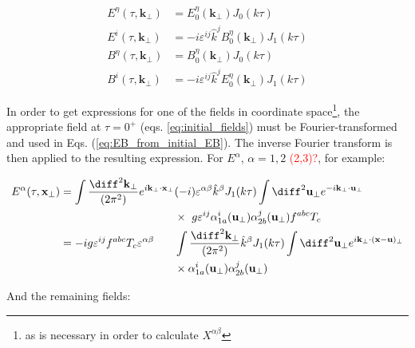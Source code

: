 \begin{subequations} \label{eq:EB_from_initial_EB}
\begin{align}
E^\eta(\tau,\mathbf{k}_\perp) & = E^\eta_0 (\mathbf{k}_\perp) J_0 (k \tau) \\
E^i(\tau,\mathbf{k}_\perp) & = -i \varepsilon^{ij} \hat{k}^j B_0^\eta (\mathbf{k}_\perp) J_1 (k \tau) \\ 
B^\eta(\tau,\mathbf{k}_\perp) & = B^\eta_0 (\mathbf{k}_\perp) J_0 (k \tau) \\
B^i(\tau,\mathbf{k}_\perp) & = -i \varepsilon^{ij} \hat{k}^j E_0^\eta (\mathbf{k}_\perp) J_1 (k \tau)
\end{align}
\end{subequations}

In order to get expressions for one of the fields in coordinate  space\textcolor{red}{\footnote{as is necessary in order to calculate $X^{\alpha \beta}$}}, the appropriate field at $\tau=0^+$ (eqs. \ref{eq:initial_fields}) must be Fourier-transformed and used in Eqs. (\ref{eq:EB_from_initial_EB}). The inverse Fourier transform is then applied to the resulting expression. For $E^\alpha$, $\alpha=1,2$ \textcolor{red}{(2,3)?}, for example:

\begin{equation}
\begin{alignedat}{2}
	E^\alpha (\tau,\mathbf{x}_\perp) & =  \int \frac{\diff^2 \mathbf{k}_\perp}{(2\pi^2)} e^{i \mathbf{k}_\perp \cdot \mathbf{x}_\perp} & & (-i)   \varepsilon^{\alpha \beta} \hat{k}^\beta J_1 (k \tau)  \int \diff^2 \mathbf{u}_\perp e^{-i \mathbf{k}_\perp \cdot \mathbf{u}_\perp} \\
	& ~ & & \times ~ g \varepsilon^{ij} \alpha^i_{1a} (\mathbf{u}_\perp) \alpha^j_{2b}(\mathbf{u}_\perp) f^{abc} T_c \\
	& = -ig \varepsilon^{ij} f^{abc} T_c \varepsilon^{\alpha \beta} & & \int  \frac{\diff^2 \mathbf{k}_\perp}{(2\pi^2)} \hat{k}^\beta J_1 (k \tau) \int \diff^2 \mathbf{u}_\perp e^{i \mathbf{k}_\perp \cdot (\mathbf{x} - \mathbf{u})_\perp}  \\
	& ~ & & \times \alpha^i_{1a} (\mathbf{u}_\perp) \alpha^j_{2b}(\mathbf{u}_\perp) 
\end{alignedat}
\end{equation}

And the remaining fields:

